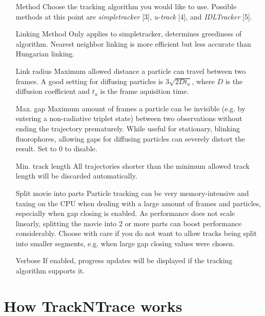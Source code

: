 \begin{itemize}
\item[Method] Choose the tracking algorithm you would like to use. Possible methods at this point are \textit{simpletracker} [3], \textit{u-track} [4], and \textit{IDLTracker} [5].
\item [Linking Method] Only applies to simpletracker, determines greediness of algorithm. Nearest neighbor linking is more efficient but less accurate than Hungarian linking.
\item [Link radius] Maximum allowed distance a particle can travel between two frames. A good setting for diffusing particles is $3\sqrt{2 D t_a}$, where $D$ is the diffusion coefficient and $t_a$ is the frame aquisition time.
\item [Max. gap] Maximum amount of frames a particle can be invisible (e.g. by entering a non-radiative triplet state) between two observations without ending the trajectory prematurely. While useful for stationary, blinking fluorophores, allowing gaps for diffusing particles can severely distort the result. Set to 0 to disable.
\item [Min. track length] All trajectories shorter than the minimum allowed track length will be discarded automatically. 
\item [Split movie into parts] Particle tracking can be very memory-intensive and taxing on the CPU when dealing with a large amount of frames and particles, especially when gap closing is enabled. As performance does not scale linearly, splitting the movie into 2 or more parts can boost performance considerably. Choose with care if you do not want to allow tracks being split into smaller segments, e.g. when large gap closing values were chosen.
\item [Verbose] If enabled, progress updates will be displayed if the tracking algorithm supports it.
\end{itemize}

\section{How TrackNTrace works}\label{sec:in-depth}



